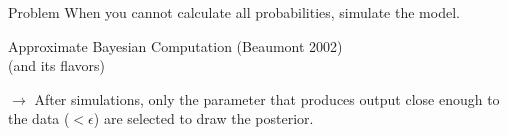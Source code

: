 \documentclass[10pt, notes=show]{beamer}
\begin{document}
\begin{frame}{Problem}
    When you cannot calculate all probabilities, simulate the model.
    \begin{center}
        Approximate Bayesian Computation (Beaumont 2002)\\
        (and its flavors)
    \end{center}
    $\rightarrow$ After simulations, only the parameter that produces output close enough to the data ($<\epsilon$) are selected to draw the posterior.
\end{frame}

%
%
%
%
%
\end{document}
